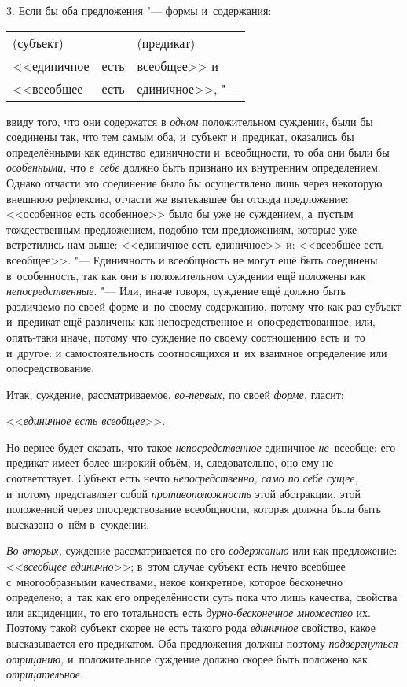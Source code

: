 3. Если бы оба предложения "--- формы и~содержания:\label{bkm:bm34a}

\begin{center}
\begin{tabular}{l c l}
(субъект) & \  & (предикат) \\
<<единичное & есть & всеобщее>> и \\
<<всеобщее & есть & единичное>>, "---
\end{tabular}
\end{center}

\noindent ввиду того, что они содержатся в {\em одном} положительном
суждении, были бы соединены так, что тем самым оба, и~субъект и~предикат,
оказались бы определёнными как единство единичности и~всеобщности, то оба
они были бы {\em особенными,} что {\em в~себе}
должно быть признано их внутренним определением. Однако
отчасти это соединение было бы осуществлено лишь через некоторую внешнюю
рефлексию, отчасти же вытекавшее бы отсюда предложение: <<особенное есть
особенное>> было бы уже не суждением, а~пустым тождественным предложением,
подобно тем предложениям, которые уже встретились нам выше: <<единичное есть
единичное>> и: <<всеобщее есть всеобщее>>. "--- Единичность и
всеобщность не могут ещё быть соединены в~особенность, так как они в
положительном суждении ещё положены как {\em непосредственные}. "---
Или, иначе говоря, суждение ещё должно быть различаемо по
своей форме и~по своему содержанию, потому что как раз субъект и~предикат
ещё различены как непосредственное и~опосредствованное, или, опять-таки
иначе, потому что суждение по своему соотношению есть и~то и~другое: и
самостоятельность соотносящихся и~их взаимное определение или опосредствование.

Итак, суждение, рассматриваемое, {\em во-первых,} по своей {\em форме,} гласит:

<<{\em единичное есть всеобщее}>>.

Но вернее будет сказать, что такое {\em непосредственное} единичное
{\em не}~всеобще: его предикат имеет более широкий объём, и,
следовательно, оно ему не соответствует. Субъект есть нечто
{\em непосредственно, само по себе сущее,} и~потому представляет собой
{\em противоположность} этой абстракции, этой положенной через опосредствование
всеобщности, которая должна была быть высказана о~нём в~суждении.

{\em Во-вторых,} суждение рассматривается по его {\em содержанию} или как
предложение: <<{\em всеобщее единично}>>; в~этом случае субъект есть нечто
всеобщее с~многообразными качествами, некое конкретное, которое бесконечно
определено; а~так как его определённости суть пока что лишь качества, свойства
или акциденции, то его тотальность есть {\em дурно-бесконечное множество} их.
Поэтому такой субъект скорее не есть такого рода {\em единичное} свойство,
какое высказывается его предикатом. Оба предложения должны поэтому
{\em подвергнуться отрицанию,} и~положительное суждение должно скорее быть
положено как {\em отрицательное}.

